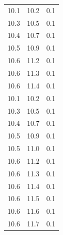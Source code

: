 \documentclass[usenatbib]{mn2e}
\begin{document}
\begin{table}
\begin{center}
\begin{tabular}{ccc}\hline\hline
10.1 & 10.2 & 0.1\\
10.3 & 10.5 & 0.1\\
10.4 & 10.7 & 0.1\\
10.5 & 10.9 & 0.1\\
10.6 & 11.2 & 0.1\\
10.6 & 11.3 & 0.1\\
10.6 & 11.4 & 0.1\\
10.1 & 10.2 & 0.1\\
10.3 & 10.5 & 0.1\\
10.4 & 10.7 & 0.1\\
10.5 & 10.9 & 0.1\\
10.5 & 11.0 & 0.1\\
10.6 & 11.2 & 0.1\\
10.6 & 11.3 & 0.1\\
10.6 & 11.4 & 0.1\\
10.6 & 11.5 & 0.1\\
10.6 & 11.6 & 0.1\\
10.6 & 11.7 & 0.1\\\hline\hline


\end{tabular}
\end{center}
\end{table}
\end{document}

